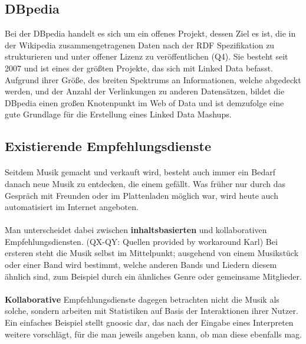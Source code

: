 \subsection{DBpedia}

Bei der DBpedia handelt es sich um ein offenes Projekt, dessen Ziel es ist, die in der Wikipedia zusammengetragenen Daten nach der RDF Spezifikation zu strukturieren und unter offener Lizenz zu veröffentlichen (Q4). Sie besteht seit 2007 und ist eines der größten Projekte, das sich mit Linked Data befasst. Aufgrund ihrer Größe, des breiten Spektrums an Informationen, welche abgedeckt werden, und der Anzahl der Verlinkungen zu anderen Datensätzen, bildet die DBpedia einen großen Knotenpunkt im Web of Data und ist demzufolge eine gute Grundlage für die Erstellung eines Linked Data Mashups.


\subsection{Existierende Empfehlungsdienste}
\paragraph{} Seitdem Musik gemacht und verkauft wird, besteht auch immer ein Bedarf danach neue Musik zu entdecken, die einem gefällt. Was früher nur durch das Gespräch mit Freunden oder im Plattenladen möglich war, wird heute auch automatisiert im Internet angeboten.

\paragraph{} Man unterscheidet dabei zwischen \textbf{inhaltsbasierten} und kollaborativen Empfehlungsdiensten. (QX-QY: Quellen provided by workaround Karl) Bei ersteren steht die Musik selbst im Mittelpunkt; ausgehend von einem Musikstück oder einer Band wird bestimmt, welche anderen Bands und Liedern diesem ähnlich sind, zum Beispiel durch ein ähnliches Genre oder gemeinsame Mitglieder.

\paragraph{} \textbf{Kollaborative} Empfehlungsdienste dagegen betrachten nicht die Musik als solche, sondern arbeiten mit Statistiken auf Basis der Interaktionen ihrer Nutzer. Ein einfaches Beispiel stellt gnoosic dar, das nach der Eingabe eines Interpreten weitere vorschlägt, für die man jeweils angeben kann, ob man diese ebenfalls mag. 

